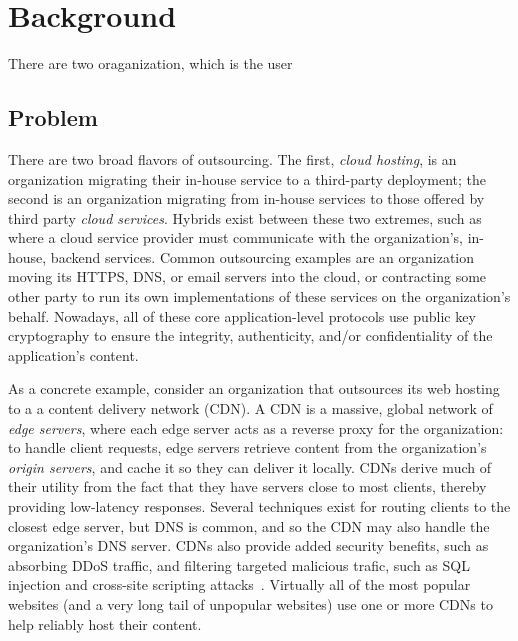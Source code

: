 \section{Background}
\label{sec:background}

There are two oraganization, which is the user




\subsection{Problem}

There are two broad flavors of outsourcing.
%
The first, \emph{cloud hosting}, is an organization migrating their in-house
service to a third-party deployment; the second is an organization  migrating
from in-house services to those offered by third party \emph{cloud services}.
%
Hybrids exist between these two extremes, such as where a cloud service
provider must communicate with the organization's, in-house, backend services.
%
Common outsourcing examples are an organization moving its HTTPS, DNS, or
email servers into the cloud, or contracting some other party to run its own
implementations of these services on the organization's behalf.
%
Nowadays, all of these core application-level protocols use public key
cryptography to ensure the integrity, authenticity, and/or confidentiality of
the application's content.


As a concrete example, consider an organization that outsources its web hosting
to a a content delivery network (CDN)\@.
%
A CDN is a massive, global network of \emph{edge servers}, where each edge
server acts as a reverse proxy for the organization: to
handle client requests, edge servers retrieve content from the organization's
\emph{origin servers}, and cache it so they can deliver it locally.
%
CDNs derive much of their utility from the fact that they have servers close to
most clients, thereby providing low-latency responses.
%
Several techniques exist for routing clients to the closest edge server, but
DNS is common, and so the CDN may also handle the organization's DNS server.
%
CDNs also provide added security benefits, such as absorbing DDoS
traffic, and filtering targeted malicious trafic, such as SQL injection and
cross-site scripting attacks~\cite{securing-cdns}.
%
Virtually all of the most popular websites (and a very long tail of unpopular
websites) use one or more CDNs to help reliably host their content.


